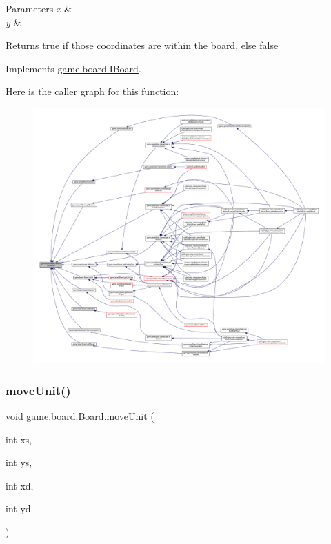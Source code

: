 \begin{DoxyParams}{Parameters}
{\em x} & \\
\hline
{\em y} & \\
\hline
\end{DoxyParams}
\begin{DoxyReturn}{Returns}
true if those coordinates are within the board, else false 
\end{DoxyReturn}


Implements \mbox{\hyperlink{interfacegame_1_1board_1_1_i_board_ad6794d47ba9f6c10be5fd956c786f0b5}{game.\+board.\+I\+Board}}.

Here is the caller graph for this function\+:
\nopagebreak
\begin{figure}[H]
\begin{center}
\leavevmode
\includegraphics[width=350pt]{classgame_1_1board_1_1_board_a02574586e2f8c3d6c4dd1672efdf0d68_icgraph}
\end{center}
\end{figure}
\mbox{\label{classgame_1_1board_1_1_board_a86ad52885974bcca106abcbcf7e3c965}} 
\subsubsection{\texorpdfstring{move\+Unit()}{moveUnit()}}
{\footnotesize\ttfamily void game.\+board.\+Board.\+move\+Unit (\begin{DoxyParamCaption}\item[{int}]{xs,  }\item[{int}]{ys,  }\item[{int}]{xd,  }\item[{int}]{yd }\end{DoxyParamCaption})\hspace{0.3cm}{\ttfamily [inline]}}


